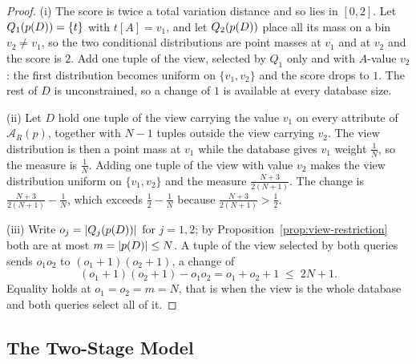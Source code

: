 \begin{proof}
(i) The score is twice a total variation distance and so lies in $[0,2]$.
Let $Q_1(p(D))=\{t\}$ with $t[A]=v_1$, and let $Q_2(p(D))$ place all its mass on a bin $v_2\ne v_1$, so the two conditional distributions are point masses at $v_1$ and at $v_2$ and the score is $2$.
Add one tuple of the view, selected by $Q_1$ only and with $A$-value $v_2$: the first distribution becomes uniform on $\{v_1,v_2\}$ and the score drops to $1$.
The rest of $D$ is unconstrained, so a change of $1$ is available at every database size.

(ii) Let $D$ hold one tuple of the view carrying the value $v_1$ on every attribute of $\mathcal{A}_R(p)$, together with $N-1$ tuples outside the view carrying $v_2$.
The view distribution is then a point mass at $v_1$ while the database gives $v_1$ weight $\tfrac1N$, so the measure is $\tfrac1N$.
Adding one tuple of the view with value $v_2$ makes the view distribution uniform on $\{v_1,v_2\}$ and the measure $\tfrac{N+3}{2(N+1)}$.
The change is $\tfrac{N+3}{2(N+1)}-\tfrac1N$, which exceeds $\tfrac12-\tfrac1N$ because $\tfrac{N+3}{2(N+1)}>\tfrac12$.

(iii) Write $o_j=|Q_j(p(D))|$ for $j=1,2$; by Proposition~\ref{prop:view-restriction} both are at most $m=|p(D)|\le N$.
A tuple of the view selected by both queries sends $o_1o_2$ to $(o_1+1)(o_2+1)$, a change of
\[
(o_1+1)(o_2+1)-o_1o_2=o_1+o_2+1\;\le\;2N+1 .
\]
Equality holds at $o_1=o_2=m=N$, that is when the view is the whole database and both queries select all of it.
\end{proof}


\subsection{The Two-Stage Model}
\label{subsec:two-stages}

